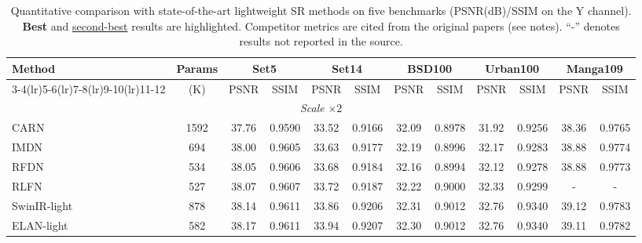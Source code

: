 \begin{table}[H]
\centering
\caption{Quantitative comparison with state-of-the-art lightweight SR methods on five benchmarks
(PSNR(dB)/SSIM on the Y channel). \textbf{Best} and \underline{second-best} results are highlighted.
Competitor metrics are cited from the original papers (see notes). ``-'' denotes results not reported
in the source.}
\label{tab:main_comparison}
\begingroup
\scriptsize
\setlength{\tabcolsep}{2.2pt}
\renewcommand{\arraystretch}{1.05}
\begin{tabular*}{\textwidth}{@{\extracolsep{\fill}}lccccccccccc}
\toprule
\multirow{2}{*}{Method} & \multirow{2}{*}{Params} &
\multicolumn{2}{c}{Set5} & \multicolumn{2}{c}{Set14} & \multicolumn{2}{c}{BSD100} &
\multicolumn{2}{c}{Urban100} & \multicolumn{2}{c}{Manga109} \\
\cmidrule(lr){3-4}\cmidrule(lr){5-6}\cmidrule(lr){7-8}\cmidrule(lr){9-10}\cmidrule(lr){11-12}
 & (K) & PSNR & SSIM & PSNR & SSIM & PSNR & SSIM & PSNR & SSIM & PSNR & SSIM \\
\midrule
\multicolumn{12}{c}{\textit{Scale} $\times 2$} \\
\midrule
CARN            & 1592 & 37.76 & 0.9590 & 33.52 & 0.9166 & 32.09 & 0.8978 & 31.92 & 0.9256 & 38.36 & 0.9765 \\
IMDN            & 694  & 38.00 & 0.9605 & 33.63 & 0.9177 & 32.19 & 0.8996 & 32.17 & 0.9283 & 38.88 & 0.9774 \\
RFDN            & 534  & 38.05 & 0.9606 & 33.68 & 0.9184 & 32.16 & 0.8994 & 32.12 & 0.9278 & 38.88 & 0.9773 \\
RLFN            & 527  & 38.07 & 0.9607 & 33.72 & 0.9187 & 32.22 & 0.9000 & 32.33 & 0.9299 & -     & -      \\
SwinIR-light    & 878  & 38.14 & 0.9611 & 33.86 & 0.9206 & 32.31 & 0.9012 & 32.76 & 0.9340 & 39.12 & 0.9783 \\
ELAN-light      & 582  & 38.17 & 0.9611 & 33.94 & 0.9207 & 32.30 & 0.9012 & 32.76 & 0.9340 & 39.11 & 0.9782 \\

\end{tabular*}
\end{table}
